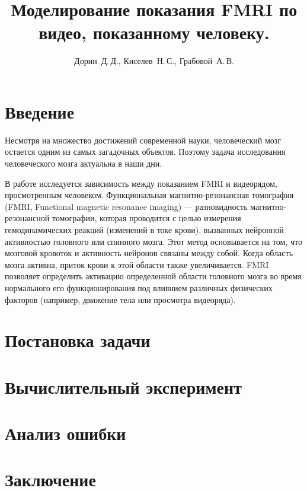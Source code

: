 \documentclass[12pt,twoside]{article}
\title
    [Моделирование показания FMRI по видео, показанному человеку] %
    {Моделирование показания FMRI по видео, показанному человеку.}
\author
    [Дорин~Д.\,Д.] %
    {Дорин~Д.\,Д., Киселев~Н.\,С., Грабовой~А.\,В.} %
    [Дорин~Д.\,Д.$^{1,2}$, Киселев~Н.\,С.$^{1,2}$, Грабовой~А.\,В.$^2$] %
\begin{document}
\maketitle
\section{Введение}
Несмотря на множество достижений современной науки, человеческий мозг остается одним из самых загадочных объектов. 
Поэтому задача исследования человеческого мозга актуальна в наши дни.

В работе исследуется зависимость между показанием FMRI и видеорядом, просмотренным человеком.
Функциональная магнитно-резонансная томография (FMRI, Functional magnetic resonance imaging) — разновидность 
магнитно-резонансной томографии, которая проводится с целью измерения гемодинамических реакций (изменений в токе крови), 
вызванных нейронной активностью головного или спинного мозга.
Этот метод основывается на том, что мозговой кровоток и активность нейронов связаны между собой.
Когда область мозга активна, приток крови к этой области также увеличивается.
FMRI позволяет определить активацию определенной области головного мозга во время нормального 
его функционирования под влиянием различных физических факторов (например, движение тела или просмотра видеоряда).

\section{Постановка задачи}

\section{Вычислительный эксперимент}


\section{Анализ ошибки}

\section{Заключение}



\end{document}
